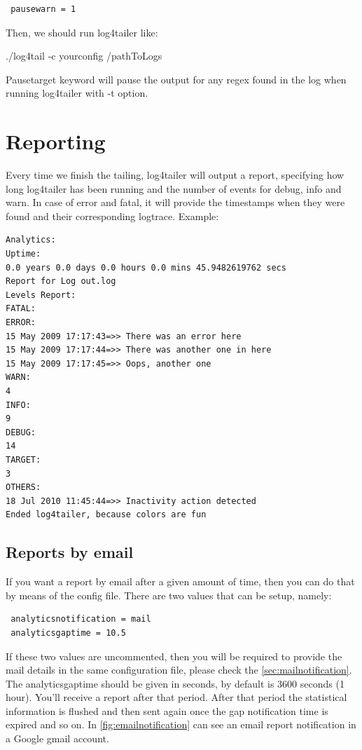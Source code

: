 \begin{config}
\begin{verbatim}
 pausewarn = 1
\end{verbatim}
\end{config}

\noindent
Then, we should run log4tailer like:
\begin{cmd}
./log4tail -c yourconfig /pathToLogs
\end{cmd}
Pausetarget keyword will pause the output for any regex found in the log when
running log4tailer with -t option.

\section{Reporting}
Every time we finish the tailing, log4tailer will output a report, specifying
how long log4tailer has been running and the number of events for debug, info
and warn. In case of error and fatal, it will provide the timestamps when they
were found and their corresponding logtrace.  Example:

\begin{verbatim}
Analytics: 
Uptime: 
0.0 years 0.0 days 0.0 hours 0.0 mins 45.9482619762 secs 
Report for Log out.log
Levels Report: 
FATAL:
ERROR:
15 May 2009 17:17:43=>> There was an error here
15 May 2009 17:17:44=>> There was another one in here
15 May 2009 17:17:45=>> Oops, another one
WARN:
4
INFO:
9
DEBUG:
14
TARGET:
3
OTHERS:
18 Jul 2010 11:45:44=>> Inactivity action detected
Ended log4tailer, because colors are fun
\end{verbatim}

\subsection{Reports by email}
If you want a report by email after a given amount of time, then you can do
that by means of the config file. There are two values that can be setup,
namely:

\begin{config}
\begin{verbatim}
 analyticsnotification = mail
 analyticsgaptime = 10.5
\end{verbatim}
\end{config}

If these two values are uncommented, then you will be required to provide the
mail details in the same configuration file, please check the
\autoref{sec:mailnotification}. The analyticsgaptime should be given in
seconds, by default is 3600 seconds (1 hour).  You'll receive a report after
that period. After that period the statistical information is flushed and then
sent again once the gap notification time is expired and so on.  In
\autoref{fig:emailnotification} %
can see an email report notification in a Google gmail account.

